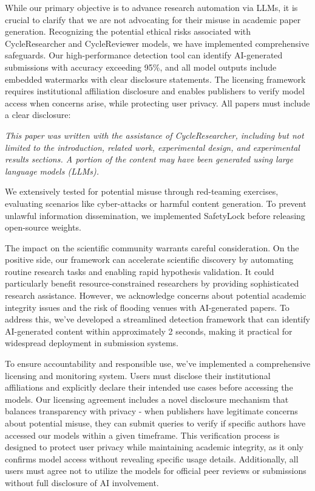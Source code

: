 \documentclass{article} %
\begin{document}
While our primary objective is to advance research automation via LLMs, it is crucial to clarify that we are not advocating for their misuse in academic paper generation. Recognizing the potential ethical risks associated with CycleResearcher and CycleReviewer models, we have implemented comprehensive safeguards.
Our high-performance detection tool can identify AI-generated submissions with accuracy exceeding 95\%, and all model outputs include embedded watermarks with clear disclosure statements. The licensing framework requires institutional affiliation disclosure and enables publishers to verify model access when concerns arise, while protecting user privacy. All papers must include a clear disclosure:
\begin{displayquote}

\textit{This paper was written with the assistance of CycleResearcher, including but not limited to the introduction, related work, experimental design, and experimental results sections. A portion of the content may have been generated using large language models (LLMs).}
\end{displayquote}

We extensively tested for potential misuse through red-teaming exercises, evaluating scenarios like cyber-attacks or harmful content generation. To prevent unlawful information dissemination, we implemented SafetyLock \citep{zhu2024locking} before releasing open-source weights.


The impact on the scientific community warrants careful consideration. On the positive side, our framework can accelerate scientific discovery by automating routine research tasks and enabling rapid hypothesis validation. It could particularly benefit resource-constrained researchers by providing sophisticated research assistance. However, we acknowledge concerns about potential academic integrity issues and the risk of flooding venues with AI-generated papers. To address this, we've developed a streamlined detection framework that can identify AI-generated content within approximately 2 seconds, making it practical for widespread deployment in submission systems.



To ensure accountability and responsible use, we've implemented a comprehensive licensing and monitoring system. Users must disclose their institutional affiliations and explicitly declare their intended use cases before accessing the models. Our licensing agreement includes a novel disclosure mechanism that balances transparency with privacy - when publishers have legitimate concerns about potential misuse, they can submit queries to verify if specific authors have accessed our models within a given timeframe. This verification process is designed to protect user privacy while maintaining academic integrity, as it only confirms model access without revealing specific usage details. Additionally, all users must agree not to utilize the models for official peer reviews or submissions without full disclosure of AI involvement.
\end{document}
